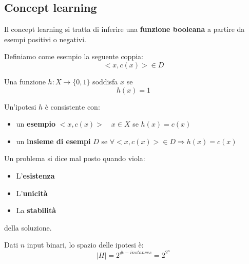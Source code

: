 \subsection{Concept learning}
Il concept learning si tratta di inferire una \textbf{funzione booleana} a partire da esempi positivi o negativi.
\begin{definition}[Esempio]
	Definiamo come esempio la seguente coppia:
	\begin{equation*}
		<x,c(x)> \in D
	\end{equation*}
\end{definition}
\begin{definition}[Soddisfa]
	Una funzione $h:X\to\{0,1\}$ soddisfa $x$ se
	\begin{equation*}
		h(x)=1
	\end{equation*}
\end{definition}
\begin{definition}[Consistenza]
	Un'ipotesi $h$ è consistente con:
	\begin{itemize}
		\item un \textbf{esempio} $<x,c(x)> \quad x \in X$ se $h(x) = c(x)$
		\item un \textbf{insieme di esempi} $D$ se $\forall <x,c(x)> \in D \Longrightarrow h(x) = c(x)$
	\end{itemize}
\end{definition}
\begin{definition}
	Un problema si dice mal posto quando viola:
	\begin{itemize}
		\item L'\textbf{esistenza}
		\item L'\textbf{unicità}
		\item La \textbf{stabilità}
	\end{itemize}
	della soluzione.
\end{definition}
\begin{definition}
	Dati $n$ input binari, lo spazio delle ipotesi è:
	\begin{equation}
		\lvert H \rvert = 2^{\#-instances}=2^{2^n}
	\end{equation}
\end{definition}

